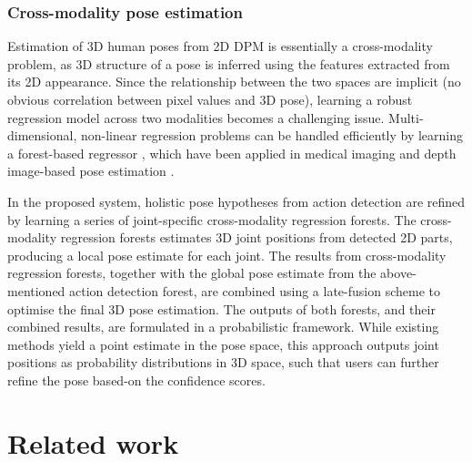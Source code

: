 \subsubsection{Cross-modality pose estimation} 

Estimation of 3D human poses from 2D DPM is essentially a cross-modality problem, as 3D structure of a pose is inferred using the features extracted from its 2D appearance. 
Since the relationship between the two spaces are implicit (no obvious correlation between pixel values and 3D pose), learning a robust regression model across two modalities becomes a challenging issue. 
Multi-dimensional, non-linear regression problems can be handled efficiently by learning a forest-based regressor \cite{Shotton2013}, which have been applied in medical imaging \cite{Criminisi2011} and depth image-based pose estimation \cite{Girshick2011}.  

In the proposed system, holistic pose hypotheses from action detection are refined by learning a series of joint-specific cross-modality regression forests. 
The cross-modality regression forests estimates 3D joint positions from detected 2D parts, producing a local pose estimate for each joint. 
The results from cross-modality regression forests, together with the global pose estimate from the above-mentioned action detection forest, are combined using a late-fusion scheme to optimise the final 3D pose estimation. 
The outputs of both forests, and their combined results, are formulated in a probabilistic framework. While existing methods yield a point estimate in the pose space, this approach outputs joint positions as probability distributions in 3D space, such that users can further refine the pose based-on the confidence scores.  


\section{Related work}
\label{sec/body/review}

